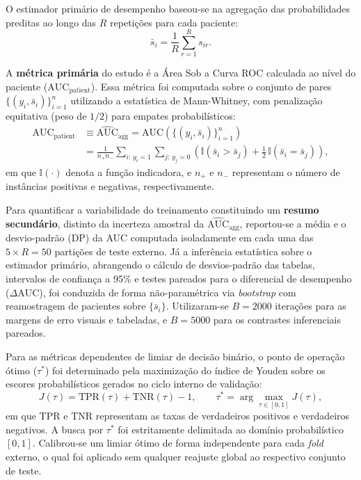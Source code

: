 \documentclass[review]{elsarticle}
\begin{document}
O estimador primário de desempenho baseou-se na agregação das probabilidades preditas ao longo das $R$ repetições para cada paciente:
\begin{equation}
	\bar{s}_i = \frac{1}{R}\sum_{r=1}^{R}s_{ir}.
	\label{eq:prob-mean}
\end{equation}

A \textbf{métrica primária} do estudo é a Área Sob a Curva ROC calculada ao nível do paciente ($\mathrm{AUC}_{\mathrm{patient}}$). Essa métrica foi computada sobre o conjunto de pares $\{(y_i,\bar{s}_i)\}_{i=1}^{n}$ utilizando a estatística de Mann-Whitney, com penalização equitativa (peso de $1/2$) para empates probabilísticos:
\begin{equation}
	\begin{split}
		\mathrm{AUC}_{\mathrm{patient}}
		&\equiv
		\widehat{\mathrm{AUC}}_{\mathrm{agg}}
		= \mathrm{AUC}\!\left(\{(y_i,\bar{s}_i)\}_{i=1}^{n}\right) \\
		&= \frac{1}{n_+ n_-}
		\sum_{i:\,y_i=1} \sum_{j:\,y_j=0}
		\left(
		\mathbb{I}(\bar{s}_i > \bar{s}_j)
		+ \tfrac{1}{2}\,\mathbb{I}(\bar{s}_i = \bar{s}_j)
		\right),
	\end{split}
	\label{eq:auc-patient}
\end{equation}
em que $\mathbb{I}(\cdot)$ denota a função indicadora, e $n_+$ e $n_-$ representam o número de instâncias positivas e negativas, respectivamente.

Para quantificar a variabilidade do treinamento constituindo um \textbf{resumo secundário}, distinto da incerteza amostral da $\widehat{\mathrm{AUC}}_{\mathrm{agg}}$, reportou-se a média e o desvio-padrão (DP) da AUC computada isoladamente em cada uma das $5 \times R = 50$ partições de teste externo. Já a inferência estatística sobre o estimador primário, abrangendo o cálculo de desvios-padrão das tabelas, intervalos de confiança a 95\% e testes pareados para o diferencial de desempenho ($\Delta\mathrm{AUC}$), foi conduzida de forma não-paramétrica via \emph{bootstrap} com reamostragem de pacientes sobre $\{\bar{s}_i\}$. Utilizaram-se $B=2000$ iterações para as margens de erro visuais e tabeladas, e $B=5000$ para os contrastes inferenciais pareados.

Para as métricas dependentes de limiar de decisão binário, o ponto de operação ótimo ($\tau^*$) foi determinado pela maximização do índice de Youden sobre os escores probabilísticos gerados no ciclo interno de validação:
\begin{equation}
	J(\tau) = \mathrm{TPR}(\tau) + \mathrm{TNR}(\tau) - 1,
	\qquad
	\tau^{*} = \arg\max_{\tau \in [0,1]} J(\tau),
	\label{eq:youden}
\end{equation}
em que $\mathrm{TPR}$ e $\mathrm{TNR}$ representam as taxas de verdadeiros positivos e verdadeiros negativos. A busca por $\tau^*$ foi estritamente delimitada ao domínio probabilístico $[0,1]$. Calibrou-se um limiar ótimo de forma independente para cada \emph{fold} externo, o qual foi aplicado sem qualquer reajuste global ao respectivo conjunto de teste. 
\end{document}
